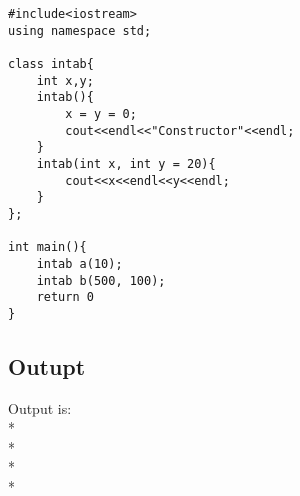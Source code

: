\begin{lstlisting}
#include<iostream>
using namespace std;

class intab{
	int x,y;
	intab(){
		x = y = 0;
		cout<<endl<<"Constructor"<<endl;
	}
	intab(int x, int y = 20){
		cout<<x<<endl<<y<<endl;
	}
};	

int main(){
	intab a(10);
	intab b(500, 100);
	return 0
}

\end{lstlisting}
\subsection{Outupt}
Output is:  
\\* 
\\* 
\\* 
\\* 

